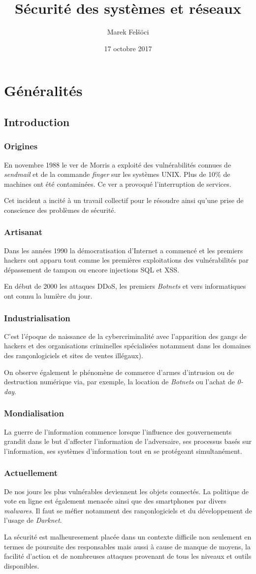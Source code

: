\documentclass[12pt, a4paper]{article}
\title{Sécurité des systèmes et réseaux}
\author{Marek Felšöci}
\date{17 octobre 2017}
\begin{document}
	\section{Généralités}
	\subsection{Introduction}
	\subsubsection{Origines}
	En novembre 1988 le ver de Morris a exploité des vulnérabilités connues de \textit{sendmail} et de la commande \textit{finger} sur les systèmes UNIX. Plus de 10\% de machines ont été contaminées. Ce ver a provoqué l'interruption de services.
	\par
	Cet incident a incité à un travail collectif pour le résoudre ainsi qu'une prise de conscience des problèmes de sécurité.
	\subsubsection{Artisanat}
	Dans les années 1990 la démocratisation d'Internet a commencé et les premiers hackers ont apparu tout comme les premières exploitations des vulnérabilités par dépassement de tampon ou encore injections SQL et XSS.
	\par
	En début de 2000 les attaques DDoS, les premiers \textit{Botnets} et vers informatiques ont connu la lumière du jour.
	\subsubsection{Industrialisation}
	C'est l'époque de naissance de la cybercriminalité avec l'apparition des gangs de hackers et des organisations criminelles spécialisées notamment dans les domaines des rançonlogiciels et sites de ventes illégaux).
	\par
	On observe également le phénomène de commerce d'armes d'intrusion ou de destruction numérique via, par exemple, la location de \textit{Botnets} ou l'achat de \textit{0-day}.
	\subsubsection{Mondialisation}
	La guerre de l'information commence lorsque l'influence des gouvernements grandit dans le but d'affecter l'information de l'adversaire, ses processus basés sur l'information, ses systèmes d'information tout en se protégeant simultanément.
	\subsubsection{Actuellement}
	De nos jours les plus vulnérables deviennent les objets connectés. La politique de vote en ligne est également menacée ainsi que des smartphones par divers \textit{malwares}. Il faut se méfier notamment des rançonlogiciels et du développement de l'usage de \textit{Darknet}.
	\par
	La sécurité est malheuresement placée dans un contexte difficile non seulement en termes de poursuite des responsables mais aussi à cause de manque de moyens, la facilité d'action et de nombreuses attaques provenant de tous les niveaux et outils disponibles. 
\end{document}

